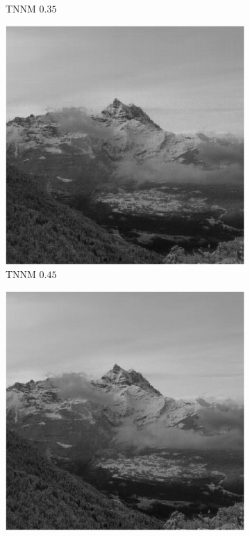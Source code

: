 \begin{figure}[!ht]
\begin{subfigure}{0.325\linewidth}
        \caption{TNNM $0.35$}
    \end{subfigure}
    \hfill
    \begin{subfigure}{0.325\linewidth}
        \includegraphics[width=\linewidth]{Poglavja/Slike/grayscale1000/slikaRez45TNNM.png}
        \caption{TNNM $0.45$}
    \end{subfigure}
    \hfill
    \begin{subfigure}{0.325\linewidth}
        \includegraphics[width=\linewidth]{Poglavja/Slike/grayscale1000/slikaRez60TNNM.png}

\end{subfigure}
\end{figure}

